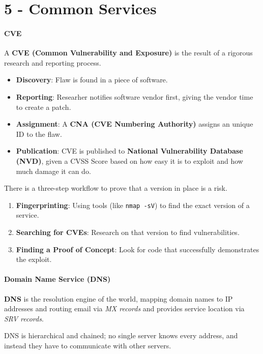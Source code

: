 \documentclass[12pt, letterpaper]{article}
\begin{document}
\part*{5 - Common Services}

\subsection*{CVE}

A \textbf{CVE (Common Vulnerability and Exposure)} is the result of a rigorous research and reporting process.

\begin{itemize}
    \item \textbf{Discovery}: Flaw is found in a piece of software.
    \item \textbf{Reporting}: Researher notifies software vendor first, giving the vendor time to create a patch.
    \item \textbf{Assignment}: A \textbf{CNA (CVE Numbering Authority)} assigns an unique ID to the flaw.
    \item \textbf{Publication}: CVE is published to \textbf{National Vulnerability Database (NVD)}, given a CVSS Score based on how easy it is to exploit and how much damage it can do.
\end{itemize}

There is a three-step workflow to prove that a version in place is a risk.

\begin{enumerate}
    \item \textbf{Fingerprinting}: Using tools (like \texttt{nmap -sV}) to find the exact version of a service.
    \item \textbf{Searching for CVEs}: Research on that version to find vulnerabilities.
    \item \textbf{Finding a Proof of Concept}: Look for code that successfully demonstrates the exploit.
\end{enumerate}

\subsection*{Domain Name Service (DNS)}

\textbf{DNS} is the resolution engine of the world, mapping domain names to IP addresses and routing email via \textit{MX records} and provides service location via \textit{SRV records}.
\medskip

DNS is hierarchical and chained; no single server knows every address, and instead they have to communicate with other servers.
\medskip
\end{document}
